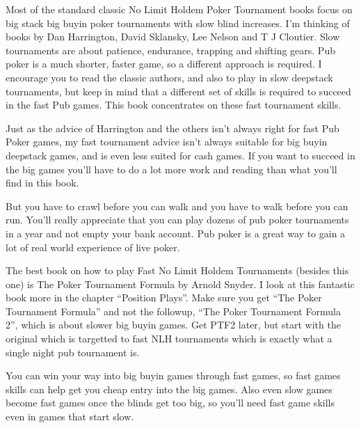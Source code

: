 
Most of the standard classic No Limit Holdem Poker Tournament books
focus on big stack big buyin poker tournaments with slow blind increases.
I'm thinking of books by Dan Harrington, David Sklansky, Lee Nelson
and T J Cloutier. Slow tournaments are about patience, endurance,
trapping and shifting gears. Pub poker is a much shorter, faster game,
so a different approach is required. I encourage you to read the
classic authors, and also to play in slow deepstack tournaments,
but keep in mind that a different set of skills is required to succeed
in the fast Pub games. This book concentrates on these fast
tournament skills.

Just as the advice of Harrington and the others isn't always right
for fast Pub Poker games, my fast tournament advice isn't always
suitable for big buyin deepstack games, and is even less suited for
cash games. If you want to succeed in the big games you'll have to do a
lot more work and reading than what you'll find in this book.

But you have to crawl before you can walk and you have to walk before
you can run. You'll really appreciate that you can play dozens of pub
poker tournaments in a year and not empty your bank account. Pub poker
is a great way to gain a lot of real world experience of live poker.

The best book on how to play Fast No Limit Holdem Tournaments
(besides this one) is The Poker Tournament Formula by Arnold Snyder.
I look at this fantastic book more in the chapter ``Position Plays''.
Make sure you get ``The Poker Tournament Formula'' and not the followup,
``The Poker Tournament Formula 2'', which is about slower big buyin games.
Get PTF2 later, but start with the original which is targetted to fast
NLH tournaments which is exactly what a single night pub tournament is.

You can win your way into big buyin games through fast games,
so fast games skills can help get you cheap entry into the big games.
Also even slow games become fast games once the blinds get too big,
so you'll need fast game skills even in games that start slow.


